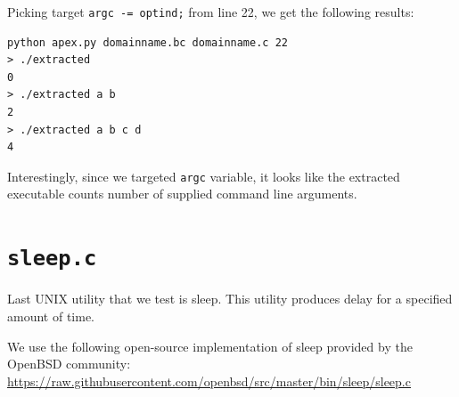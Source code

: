 \documentclass[12pt, twoside]{fithesis2}
\renewcommand{\_}{\leavevmode \kern0.07em\vbox{\hrule width0.4em}}
\begin{document}
Picking target \texttt{argc -= optind;} from line 22, we get the
following results:

\begin{verbatim}
python apex.py domainname.bc domainname.c 22
> ./extracted
0
> ./extracted a b
2
> ./extracted a b c d
4
\end{verbatim}

Interestingly, since we targeted \texttt{argc} variable, it looks like
the extracted executable counts number of supplied command line arguments.

\section{\texttt{sleep.c}}
\label{sec:sleep}

Last UNIX utility that we test is sleep.
This utility produces delay for a specified amount of time.

We use the following open-source implementation of sleep provided by the
OpenBSD community:
\url{https://raw.githubusercontent.com/openbsd/src/master/bin/sleep/sleep.c}
\end{document}
